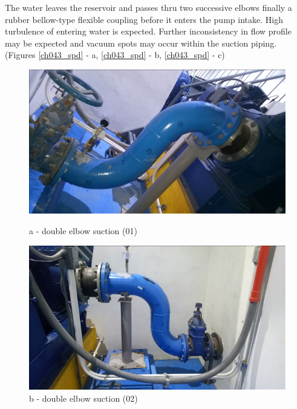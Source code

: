 The water leaves the reservoir and passes thru two successive elbows finally a rubber bellow-type flexible coupling before it enters the pump intake. High turbulence of entering water is expected. Further inconsistency in flow profile may be expected and vacuum spots may occur within the suction piping. (Figures \ref{ch043_spd} - a, \ref{ch043_spd} - b, \ref{ch043_spd} - c)

\begin{figure}[!htb]
	\begin{minipage}[b]{0.3\linewidth}
		\centering
		\includegraphics[width=\textwidth]{figures/ch043_double_elbow_suction1}
		\caption*{a - double elbow suction (01)}
		\label{ch043_double_elbow_suction1}
	\end{minipage}
	\hspace{0.05cm}
	\begin{minipage}[b]{0.3\linewidth}
		\centering
		\includegraphics[width=\textwidth]{figures/ch043_double_elbow_suction2}
		\caption*{b - double elbow suction (02)}
		\label{ch043_double_elbow_suction2}
	\end{minipage}
	\hspace{0.05cm}

\end{figure}

